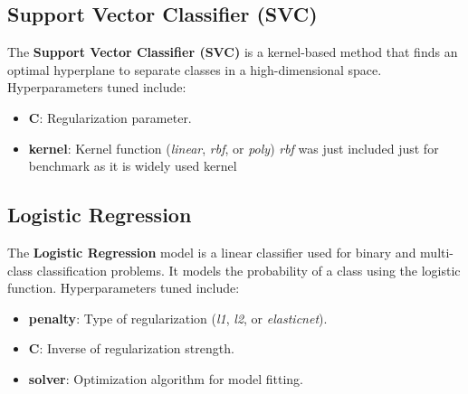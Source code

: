 \documentclass{article}
\begin{document}
\subsection{Support Vector Classifier (SVC)}
The \textbf{Support Vector Classifier (SVC)} is a kernel-based method that finds an optimal hyperplane to separate classes in a high-dimensional space. Hyperparameters tuned include:
\begin{itemize}
    \item \textbf{C}: Regularization parameter.
    \item \textbf{kernel}: Kernel function (\textit{linear}, \textit{rbf}, or \textit{poly})  \textit{rbf} was just included 
    just for benchmark as it is widely used kernel
\end{itemize}

\begin{table}[!htbp]
    \centering
    \caption{SVC Grid Search Results}
    \label{tab:table}
\end{table}
    

\subsection{Logistic Regression}
The \textbf{Logistic Regression} model is a linear classifier used for binary and multi-class classification problems. It models the probability of a class using the logistic function. Hyperparameters tuned include:
\begin{itemize}
    \item \textbf{penalty}: Type of regularization (\textit{l1}, \textit{l2}, or \textit{elasticnet}).
    \item \textbf{C}: Inverse of regularization strength.
    \item \textbf{solver}: Optimization algorithm for model fitting.
\end{itemize}
\end{document}
